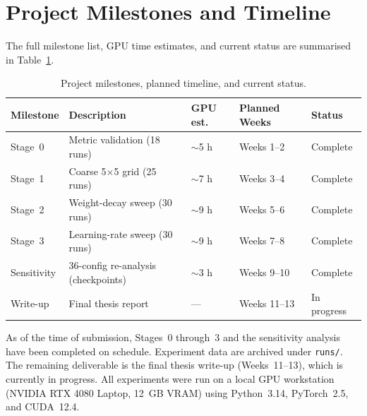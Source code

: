 \documentclass[12pt,openany,a4paper]{book}
\begin{document}
\section{Project Milestones and Timeline}

The full milestone list, GPU time estimates, and current status are
summarised in Table~\ref{tab:milestones}.

\begin{table}[htbp]
  \centering
  \caption{Project milestones, planned timeline, and current status.}
  \label{tab:milestones}
  \renewcommand{\arraystretch}{1.2}
  \begin{tabular}{lllll}
    \toprule
    Milestone & Description & GPU est. & Planned Weeks & Status \\
    \midrule
    Stage~0 & Metric validation (18 runs) & $\sim$5 h & Weeks 1--2 & Complete \\
    Stage~1 & Coarse 5$\times$5 grid (25 runs) & $\sim$7 h & Weeks 3--4 & Complete \\
    Stage~2 & Weight-decay sweep (30 runs) & $\sim$9 h & Weeks 5--6 & Complete \\
    Stage~3 & Learning-rate sweep (30 runs) & $\sim$9 h & Weeks 7--8 & Complete \\
    Sensitivity & 36-config re-analysis (checkpoints) & $\sim$3 h & Weeks 9--10 & Complete \\
    Write-up  & Final thesis report & --- & Weeks 11--13 & In progress \\
    \bottomrule
  \end{tabular}
\end{table}

As of the time of submission, Stages~0 through~3 and the sensitivity
analysis have been completed on schedule.
Experiment data are archived under \texttt{runs/}.
The remaining deliverable is the final thesis write-up (Weeks~11--13),
which is currently in progress.
All experiments were run on a local GPU workstation
(NVIDIA RTX 4080 Laptop, 12~GB VRAM) using
Python~3.14, PyTorch~2.5, and CUDA~12.4.
\end{document}
